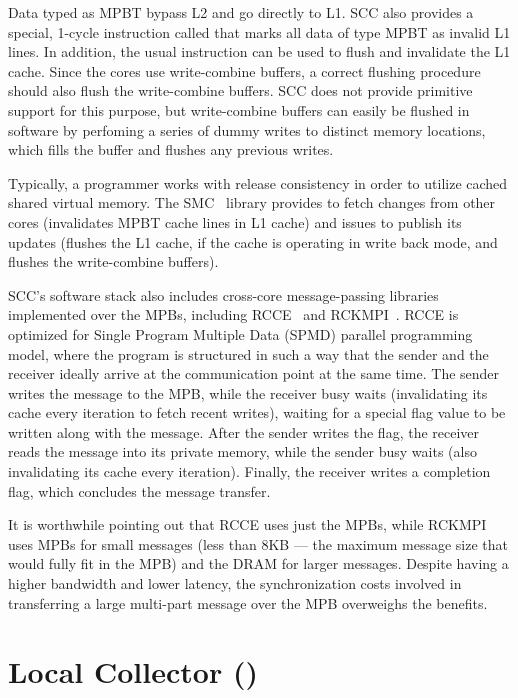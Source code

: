 Data typed as MPBT bypass L2 and go directly to L1. SCC also provides a
special, 1-cycle instruction called  that marks all data of type
MPBT as invalid L1 lines. In addition, the usual  instruction can be
used to flush and invalidate the L1 cache. Since the cores use write-combine
buffers, a correct flushing procedure should also flush the write-combine
buffers. SCC does not provide primitive support for this purpose, but
write-combine buffers can easily be flushed in software by perfoming a series
of dummy writes to distinct memory locations, which fills the buffer and
flushes any previous writes.

Typically, a programmer works with release consistency in order to utilize
cached shared virtual memory. The SMC~\cite{SMC} library provides
 to fetch changes from other cores (invalidates MPBT cache
lines in L1 cache) and issues  to publish its updates (flushes
the L1 cache, if the cache is operating in write back mode, and flushes the
write-combine buffers).

SCC's software stack also includes cross-core message-passing libraries
implemented over the MPBs, including RCCE~\cite{Mattson2010} and
RCKMPI~\cite{Urena2011}. RCCE is optimized for Single Program Multiple Data
(SPMD) parallel programming model, where the program is structured in such a
way that the sender and the receiver ideally arrive at the communication point
at the same time. The sender writes the message to the MPB, while the receiver
busy waits (invalidating its cache every iteration to fetch recent writes),
waiting for a special flag value to be written along with the message. After
the sender writes the flag, the receiver reads the message into its private
memory, while the sender busy waits (also invalidating its cache every
iteration). Finally, the receiver writes a completion flag, which concludes the
message transfer.

It is worthwhile pointing out that RCCE uses just the MPBs, while RCKMPI uses
MPBs for small messages (less than 8KB --- the maximum message size that would
fully fit in the MPB) and the DRAM for larger messages. Despite having a higher
bandwidth and lower latency, the synchronization costs involved in transferring
a large multi-part message over the MPB overweighs the benefits.

\section{Local Collector (\lc)}
\label{sec:lc}

